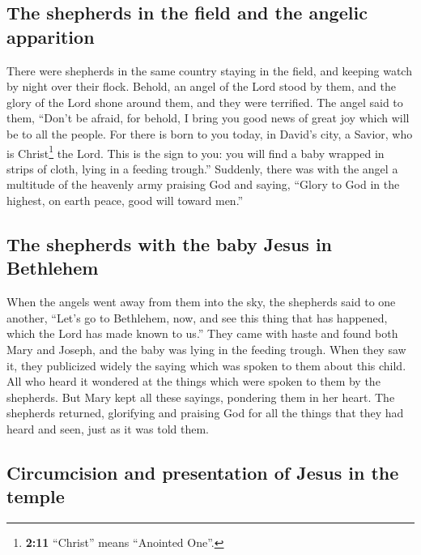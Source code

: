 \hypertarget{the-shepherds-in-the-field-and-the-angelic-apparition}{%
\subsection{The shepherds in the field and the angelic
apparition}\label{the-shepherds-in-the-field-and-the-angelic-apparition}}

 There were shepherds in the same country staying in the
field, and keeping watch by night over their flock. 
Behold, an angel of the Lord stood by them, and the glory of the Lord
shone around them, and they were terrified.  The angel
said to them, ``Don't be afraid, for behold, I bring you good news of
great joy which will be to all the people.  For there is
born to you today, in David's city, a Savior, who is Christ\footnote{\textbf{2:11}
  ``Christ'' means ``Anointed One''.} the Lord.  This is
the sign to you: you will find a baby wrapped in strips of cloth, lying
in a feeding trough.''  Suddenly, there was with the
angel a multitude of the heavenly army praising God and saying,
 ``Glory to God in the highest, on earth peace, good will
toward men.''

\hypertarget{the-shepherds-with-the-baby-jesus-in-bethlehem}{%
\subsection{The shepherds with the baby Jesus in
Bethlehem}\label{the-shepherds-with-the-baby-jesus-in-bethlehem}}

 When the angels went away from them into the sky, the
shepherds said to one another, ``Let's go to Bethlehem, now, and see
this thing that has happened, which the Lord has made known to us.''
 They came with haste and found both Mary and Joseph, and
the baby was lying in the feeding trough.  When they saw
it, they publicized widely the saying which was spoken to them about
this child.  All who heard it wondered at the things
which were spoken to them by the shepherds.  But Mary
kept all these sayings, pondering them in her heart.  The
shepherds returned, glorifying and praising God for all the things that
they had heard and seen, just as it was told them.

\hypertarget{circumcision-and-presentation-of-jesus-in-the-temple}{%
\subsection{Circumcision and presentation of Jesus in the
temple}\label{circumcision-and-presentation-of-jesus-in-the-temple}}

